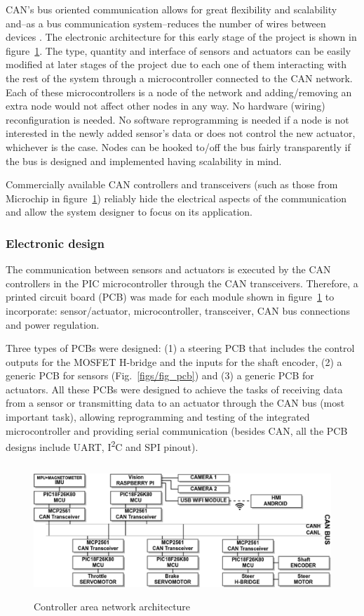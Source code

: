 \documentclass[twocolumn,10pt]{asme2e}
\begin{document}
CAN's bus oriented communication allows for great flexibility and
scalability and--as a bus communication system--reduces the number of wires between devices \cite{hchen, lunng}.
The electronic architecture for this early stage of the
project is shown in figure~\ref{figs/fig_hw}. The type, quantity and interface
of sensors and actuators can be easily modified at later stages of the
project due to each one of them interacting with the rest of the system
through a microcontroller connected to the CAN network. Each of these
microcontrollers is a node of the network and adding/removing
an extra node would not affect other nodes in any way. No hardware
(wiring) reconfiguration is needed. No software reprogramming is
needed if a node is not interested in the newly added sensor's data
or does not control the new actuator, whichever is the case. Nodes
can be hooked to/off the bus fairly transparently if the bus is
designed and implemented having scalability in mind.

Commercially available CAN controllers and transceivers (such as
those from Microchip in figure~\ref{figs/fig_hw}) reliably hide
the electrical aspects of the communication and allow the system
designer to focus on its application.

\subsubsection*{Electronic design}
The communication between sensors and actuators is executed by the CAN controllers in the PIC
microcontroller through the CAN transceivers. Therefore, a printed circuit board (PCB)
was made for each module shown in figure~\ref{figs/fig_hw} to incorporate: sensor/actuator,
microcontroller, transceiver, CAN bus connections and power regulation.

Three types of PCBs were designed: (1) a steering PCB that includes the control outputs for the MOSFET
H-bridge and the inputs for the shaft encoder, (2) a generic PCB for sensors (Fig.~\ref{figs/fig_pcb}) and (3) a generic PCB
for actuators. All these PCBs were designed to achieve the tasks of receiving data from a sensor or transmitting data
to an actuator through the CAN bus (most important task), allowing reprogramming and testing of the integrated microcontroller and
providing serial communication (besides CAN, all the PCB designs include UART, I\textsuperscript{2}C and SPI pinout).

\begin{figure}[ht!]
\begin{center}
\includegraphics[height=5cm]{figs/fig_hw.eps}
\caption{Controller area network architecture}
\label{figs/fig_hw}
\end{center}
\end{figure}
\end{document}
